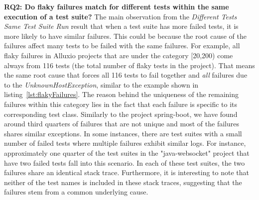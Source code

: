 \textbf{RQ2: Do flaky failures match for different tests within the same execution of a test suite?} The main observation from the \emph{Different Tests Same Test Suite Run} result that when a test suite has more failed tests, it is more likely to have similar failures. This could be because the root cause of the failures affect many tests to be failed with the same failures. For example, all flaky failures in Alluxio projects that are under the category [20,200) come always from 116 tests (the total number of flaky tests in the project). That means the same root cause that forces all 116 tests to fail together and \emph{all} failures due to the \emph{UnknownHostException}, similar to the example shown in listing~\ref{lst:flakyFailures}. 
The reason behind the uniqueness of the remaining failures within this category lies in the fact that each failure is specific to its corresponding test class.
Similarly to the project spring-boot, we have found around third quarters of failures that are not unique and most of the failures shares similar exceptions. 
In some instances, there are test suites with a small number of failed tests where multiple failures exhibit similar logs. 
For instance, approximately one quarter of the test suites in the "java-websocket" project that have two failed tests fall into this scenario. 
In each of these test suites, the two failures share an identical stack trace. Furthermore, it is interesting to note that neither of the test names is included in these stack traces, suggesting that the failures stem from a common underlying cause.


